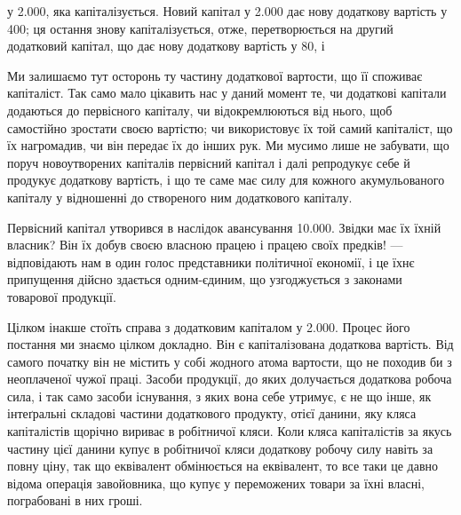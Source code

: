 \parcont{}  %
у \num{2.000}, яка капіталізується. Новий капітал у
\num{2.000} дає нову додаткову вартість у 400; ця остання знову капіталізується, отже, перетворюється
на другий додатковий капітал, що дає нову додаткову
вартість у 80, і~

Ми залишаємо тут осторонь ту частину додаткової вартости,
що її споживає капіталіст. Так само мало цікавить нас у даний
момент те, чи додаткові капітали додаються до первісного капіталу,
чи відокремлюються від нього, щоб самостійно зростати
своєю вартістю; чи використовує їх той самий капіталіст, що
їх нагромадив, чи він передає їх до інших рук. Ми мусимо лише
не забувати, що поруч новоутворених капіталів первісний капітал
і далі репродукує себе й продукує додаткову вартість, і що
те саме має силу для кожного акумульованого капіталу у відношенні
до створеного ним додаткового капіталу.

Первісний капітал утворився в наслідок авансування \num{10.000}. Звідки має їх їхній власник? Він їх добув
своєю власною працею і працею своїх предків! — відповідають
нам в один голос представники політичної економії, і це їхнє
припущення дійсно здається одним-єдиним, що узгоджується
з законами товарової продукції.

Цілком інакше стоїть справа з додатковим капіталом у \num{2.000}. Процес його постання ми знаємо цілком докладно.
Він є капіталізована додаткова вартість. Від самого початку
він не містить у собі жодного атома вартости, що не походив
би з неоплаченої чужої праці. Засоби продукції, до яких долучається
додаткова робоча сила, і так само засоби існування,
з яких вона себе утримує, є не що інше, як інтеґральні складові
частини додаткового продукту, отієї данини, яку кляса капіталістів
щорічно вириває в робітничої кляси. Коли кляса капіталістів
за якусь частину цієї данини купує в робітничої кляси
додаткову робочу силу навіть за повну ціну, так що еквівалент
обмінюється на еквівалент, то все таки це давно відома операція
завойовника, що купує у переможених товари за їхні власні,
пограбовані в них гроші.

